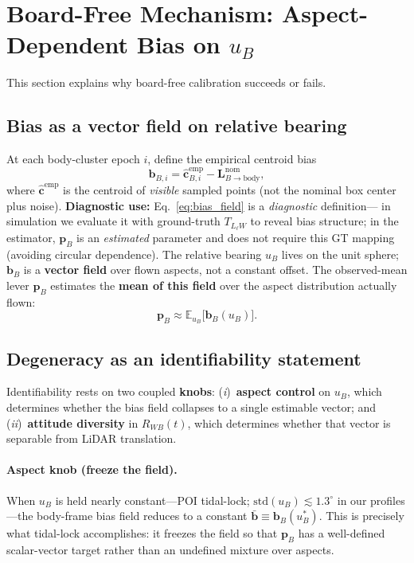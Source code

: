 \section{Board-Free Mechanism: Aspect-Dependent Bias on $u_B$}
\label{sec:mechanism}

This section explains why board-free calibration succeeds or fails.

\subsection{Bias as a vector field on relative bearing}
At each body-cluster epoch $i$, define the empirical centroid bias
\begin{equation}
  \mathbf{b}_{B,i}
  = \hat{\mathbf{c}}_{B,i}^{\mathrm{emp}}
  - \mathbf{L}_{B\to\mathrm{body}}^{\mathrm{nom}},
  \label{eq:bias_field}
\end{equation}
where $\hat{\mathbf{c}}^{\mathrm{emp}}$ is the centroid of \emph{visible} sampled
points (not the nominal box center plus noise).
\textbf{Diagnostic use:} Eq.~\eqref{eq:bias_field} is a \emph{diagnostic} definition---
in simulation we evaluate it with ground-truth $T_{L_\ell W}$ to reveal bias
structure; in the estimator, $\mathbf{p}_B$ is an \emph{estimated} parameter and
does not require this GT mapping (avoiding circular dependence).
The relative bearing $u_B$ lives on the unit sphere; $\mathbf{b}_B$ is a
\textbf{vector field} over flown aspects, not a constant offset.
The observed-mean lever $\mathbf{p}_B$ estimates the \textbf{mean of this field}
over the aspect distribution actually flown:
\begin{equation}
  \mathbf{p}_B \approx \mathbb{E}_{u_B}\big[\mathbf{b}_B(u_B)\big].
  \label{eq:pB_mean}
\end{equation}

\subsection{Degeneracy as an identifiability statement}
\label{sec:mechanism_identifiability}

Identifiability rests on two coupled \textbf{knobs}: (\emph{i})~\textbf{aspect control}
on $u_B$, which determines whether the bias field collapses to a single estimable
vector; and (\emph{ii})~\textbf{attitude diversity} in $R_{WB}(t)$, which determines
whether that vector is separable from LiDAR translation.

\paragraph{Aspect knob (freeze the field).}
When $u_B$ is held nearly constant---POI tidal-lock; $\mathrm{std}(u_B)\lesssim 1.3^\circ$
in our profiles---the body-frame bias field reduces to a constant
$\bar{\mathbf{b}} \equiv \mathbf{b}_B(u_B^*)$.
This is precisely what tidal-lock accomplishes: it freezes the field so that
$\mathbf{p}_B$ has a well-defined scalar-vector target rather than an undefined
mixture over aspects.

